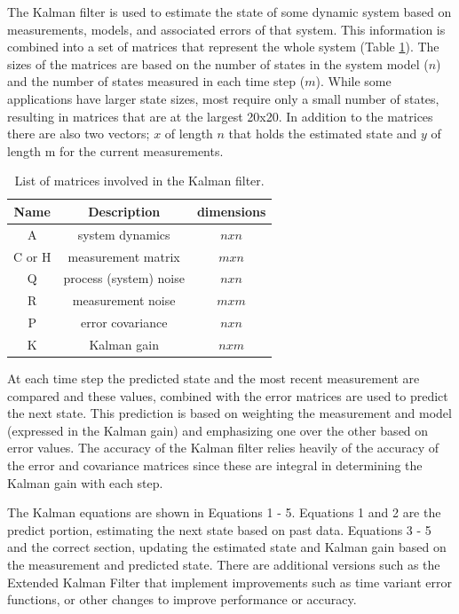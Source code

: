\documentclass[11pt]{article}
\begin{document}
The Kalman filter is used to estimate the state of some dynamic system based on measurements, models, and associated errors of that system. This information is combined into a set of matrices that represent the whole system (Table \ref{mats}). The sizes of the matrices are based on the number of states in the system model ($n$) and the number of states measured in each time step ($m$). While some applications have larger state sizes, most require only a small number of states, resulting in matrices that are at the largest 20x20. In addition to the matrices there are also two vectors; $x$ of length $n$ that holds the estimated state and $y$ of length m for the current measurements.

\begin{table}
\caption{List of matrices involved in the Kalman filter.} 
\label{mats}
\centering
\begin{tabular}{||c c c||} 
\hline
Name & Description & dimensions \\ [0.5ex] 
\hline\hline
A & system dynamics & $nxn$\\
\hline
C or H & measurement matrix & $mxn$\\
\hline
Q & process (system) noise & $nxn$\\
\hline
R & measurement noise & $mxm$\\
\hline
P & error covariance & $nxn$\\
\hline
K & Kalman gain & $nxm$\\
\hline
\end{tabular}
\end{table}

At each time step the predicted state and the most recent measurement are compared and these values, combined with the error matrices are used to predict the next state. This prediction is based on weighting the measurement and model (expressed in the Kalman gain) and emphasizing one over the other based on error values. The accuracy of the Kalman filter relies heavily of the accuracy of the error and covariance matrices since these are integral in determining the Kalman gain with each step.

The Kalman equations are shown in Equations 1 - 5. Equations 1 and 2 are the predict portion, estimating the next state based on past data. Equations 3 - 5 and the correct section, updating the estimated state and Kalman gain based on the measurement and predicted state. There are additional versions such as the Extended Kalman Filter that implement improvements such as time variant error functions, or other changes to improve performance or accuracy.
\end{document}
